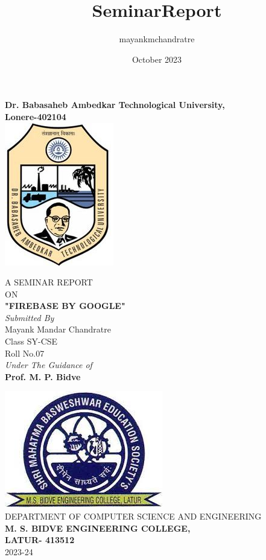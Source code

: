 \documentclass[12pt,a4paper]{report}
\title{SeminarReport}
\author{mayankmchandratre} %
\date{October 2023}
\begin{document}

\begin{center} %
    \textbf{\large{Dr. Babasaheb Ambedkar Technological University,\\ Lonere-402104}}\\ %
    \vspace{2cm}
    \includegraphics[scale=0.5]{dbatu.jpeg} %
    \vspace{1cm}

    A SEMINAR REPORT\\ON\\
    \textbf{\large{"FIREBASE BY GOOGLE"}}\\ %
    \vspace{1cm}
    \textit{Submitted By}\\
    \vspace{0.5cm}
    Mayank Mandar Chandratre\\ %
    Class SY-CSE\\
    Roll No.07\\
    \vspace{1cm}
    \textit{Under The Guidance of}\\
    \vspace{0.5cm}
    \textbf{Prof. M. P. Bidve} %
    \vspace{1cm}

    \includegraphics[scale=0.4]{download.jpeg}\\ %
    \vspace{0.5cm}
   DEPARTMENT OF COMPUTER SCIENCE AND ENGINEERING\\
    \textbf{M. S. BIDVE ENGINEERING COLLEGE,}\\ %
    \textbf{LATUR- 413512}\\
    2023-24\\
    
    
\end{center}
\newpage
{}
\end{document}
